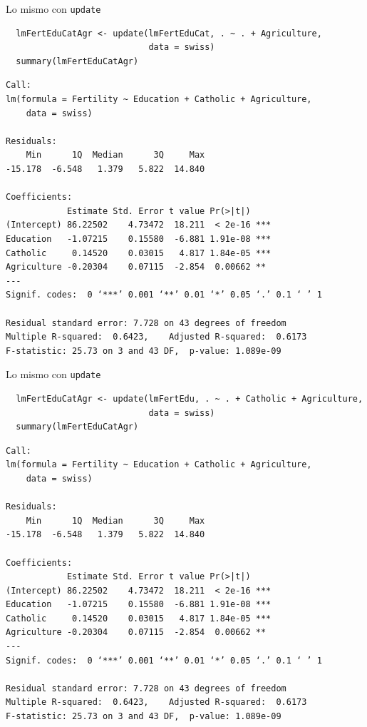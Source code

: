 \documentclass[xcolor={usenames,svgnames,dvipsnames}]{beamer}
\begin{document}
\begin{frame}[fragile,label=sec-3-6]{Lo mismo con \texttt{update}}
 \lstset{language=R,label= ,caption= ,numbers=none}
\begin{lstlisting}
  lmFertEduCatAgr <- update(lmFertEduCat, . ~ . + Agriculture,
                            data = swiss)
  summary(lmFertEduCatAgr)
\end{lstlisting}

\begin{verbatim}
Call:
lm(formula = Fertility ~ Education + Catholic + Agriculture, 
    data = swiss)

Residuals:
    Min      1Q  Median      3Q     Max 
-15.178  -6.548   1.379   5.822  14.840 

Coefficients:
            Estimate Std. Error t value Pr(>|t|)    
(Intercept) 86.22502    4.73472  18.211  < 2e-16 ***
Education   -1.07215    0.15580  -6.881 1.91e-08 ***
Catholic     0.14520    0.03015   4.817 1.84e-05 ***
Agriculture -0.20304    0.07115  -2.854  0.00662 ** 
---
Signif. codes:  0 ‘***’ 0.001 ‘**’ 0.01 ‘*’ 0.05 ‘.’ 0.1 ‘ ’ 1

Residual standard error: 7.728 on 43 degrees of freedom
Multiple R-squared:  0.6423,	Adjusted R-squared:  0.6173 
F-statistic: 25.73 on 3 and 43 DF,  p-value: 1.089e-09
\end{verbatim}
\end{frame}

\begin{frame}[fragile,label=sec-3-7]{Lo mismo con \texttt{update}}
 \lstset{language=R,label= ,caption= ,numbers=none}
\begin{lstlisting}
  lmFertEduCatAgr <- update(lmFertEdu, . ~ . + Catholic + Agriculture,
                            data = swiss)
  summary(lmFertEduCatAgr)
\end{lstlisting}

\begin{verbatim}
Call:
lm(formula = Fertility ~ Education + Catholic + Agriculture, 
    data = swiss)

Residuals:
    Min      1Q  Median      3Q     Max 
-15.178  -6.548   1.379   5.822  14.840 

Coefficients:
            Estimate Std. Error t value Pr(>|t|)    
(Intercept) 86.22502    4.73472  18.211  < 2e-16 ***
Education   -1.07215    0.15580  -6.881 1.91e-08 ***
Catholic     0.14520    0.03015   4.817 1.84e-05 ***
Agriculture -0.20304    0.07115  -2.854  0.00662 ** 
---
Signif. codes:  0 ‘***’ 0.001 ‘**’ 0.01 ‘*’ 0.05 ‘.’ 0.1 ‘ ’ 1

Residual standard error: 7.728 on 43 degrees of freedom
Multiple R-squared:  0.6423,	Adjusted R-squared:  0.6173 
F-statistic: 25.73 on 3 and 43 DF,  p-value: 1.089e-09
\end{verbatim}
\end{frame}
\end{document}
